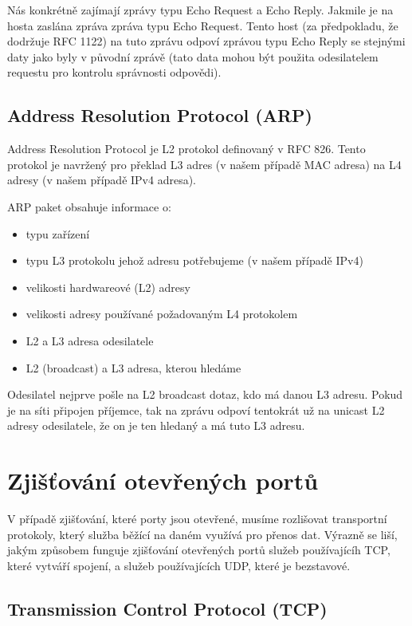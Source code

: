 \documentclass[../projekt.tex]{subfiles}
\begin{document}
Nás konkrétně zajímají zprávy typu Echo Request a Echo Reply. Jakmile je na hosta zaslána zpráva zpráva typu Echo Request. Tento host (za předpokladu, že dodržuje RFC 1122\cite{RFC1122}) na tuto zprávu odpoví zprávou typu Echo Reply se stejnými daty jako byly v původní zprávě (tato data mohou být použita odesilatelem requestu pro kontrolu správnosti odpovědi).

\subsection{Address Resolution Protocol (ARP)} \label{arp}
Address Resolution Protocol je L2 protokol definovaný v RFC 826\cite{RFC0826}. Tento protokol je navržený pro překlad L3 adres (v našem případě MAC adresa) na L4 adresy (v našem případě IPv4 adresa).

ARP paket obsahuje informace o:
\begin{itemize}
    \item typu zařízení
    \item typu L3 protokolu jehož adresu potřebujeme (v našem případě IPv4)
    \item velikosti hardwareové (L2) adresy
    \item velikosti adresy používané požadovaným L4 protokolem
    \item L2 a L3 adresa odesilatele
    \item L2 (broadcast) a L3 adresa, kterou hledáme
\end{itemize}

Odesilatel nejprve pošle na L2 broadcast dotaz, kdo má danou L3 adresu. Pokud je na síti připojen příjemce, tak na zprávu odpoví tentokrát už na unicast L2 adresy odesilatele, že on je ten hledaný a má tuto L3 adresu.

\section{Zjišťování otevřených portů}

V případě zjišťování, které porty jsou otevřené, musíme rozlišovat transportní protokoly, který služba běžící na daném využívá pro přenos dat. Výrazně se liší, jakým způsobem funguje zjišťování otevřených portů služeb používajícíh TCP, které vytváří spojení, a služeb používajících UDP, které je bezstavové.

\subsection{Transmission Control Protocol (TCP)} \label{tcp}
\end{document}
